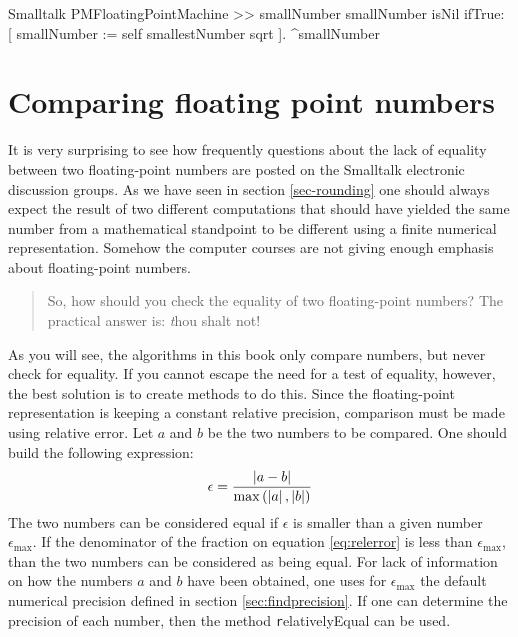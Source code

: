\begin{displaycode}{Smalltalk}
PMFloatingPointMachine >> smallNumber
    smallNumber isNil
        ifTrue: [ smallNumber := self smallestNumber sqrt ].
    ^smallNumber
\end{displaycode}

\section{Comparing floating point numbers}
It is very surprising to see how frequently questions about the
lack of equality between two floating-point numbers are posted on
the Smalltalk electronic discussion groups. As we have
seen in section \ref{sec-rounding} one should always expect the
result of two different computations that should have yielded the
same number from a mathematical standpoint to be different using a
finite  numerical representation. Somehow the computer courses are
not giving enough emphasis about floating-point numbers.

\begin{quote}
So, how should you check the equality of two floating-point
numbers? \linebreak\noindent\hfil The practical answer is: {\textsl
thou shalt not!}
\end{quote}

\noindent As you will see, the algorithms in this book only
compare numbers, but never check for equality. If you cannot
escape the need for a test of equality, however, the best solution
is to create methods to do this. Since the floating-point
representation is keeping a constant relative precision,
comparison must be made using relative error. Let $a$ and $b$ be
the two numbers to be compared. One should build the following
expression:
\begin{equation}
\label{eq:relerror}
\epsilon={\left|a-b\right| \over
\max\left(\left|a\right|,\left|b\right|\right)}
\end{equation}
The two numbers can be considered equal if $\epsilon$ is smaller
than a given number $\epsilon_{\max}$. If the denominator of the
fraction on equation \ref{eq:relerror} is less than
$\epsilon_{\max}$, than the two numbers can be considered as being
equal. For lack of information on how the numbers $a$ and $b$ have
been obtained, one uses for $\epsilon_{\max}$ the default
numerical precision defined in section \ref{sec:findprecision}. If
one can determine the precision of each number, then the method
{\texttt relativelyEqual} can be used.

